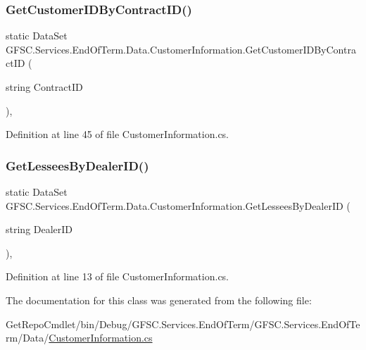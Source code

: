 \subsubsection{\texorpdfstring{Get\+Customer\+I\+D\+By\+Contract\+I\+D()}{GetCustomerIDByContractID()}}
{\footnotesize\ttfamily static Data\+Set G\+F\+S\+C.\+Services.\+End\+Of\+Term.\+Data.\+Customer\+Information.\+Get\+Customer\+I\+D\+By\+Contract\+ID (\begin{DoxyParamCaption}\item[{string}]{Contract\+ID }\end{DoxyParamCaption})\hspace{0.3cm}{\ttfamily [static]}, {\ttfamily [package]}}



Definition at line 45 of file Customer\+Information.\+cs.

\mbox{\label{class_g_f_s_c_1_1_services_1_1_end_of_term_1_1_data_1_1_customer_information_a6f3f3f8ad5caeebf7818f4985dbf47db}} 
\subsubsection{\texorpdfstring{Get\+Lessees\+By\+Dealer\+I\+D()}{GetLesseesByDealerID()}}
{\footnotesize\ttfamily static Data\+Set G\+F\+S\+C.\+Services.\+End\+Of\+Term.\+Data.\+Customer\+Information.\+Get\+Lessees\+By\+Dealer\+ID (\begin{DoxyParamCaption}\item[{string}]{Dealer\+ID }\end{DoxyParamCaption})\hspace{0.3cm}{\ttfamily [static]}, {\ttfamily [package]}}



Definition at line 13 of file Customer\+Information.\+cs.



The documentation for this class was generated from the following file\+:\begin{DoxyCompactItemize}
\item 
Get\+Repo\+Cmdlet/bin/\+Debug/\+G\+F\+S\+C.\+Services.\+End\+Of\+Term/\+G\+F\+S\+C.\+Services.\+End\+Of\+Term/\+Data/\mbox{\hyperlink{_data_2_customer_information_8cs}{Customer\+Information.\+cs}}\end{DoxyCompactItemize}
